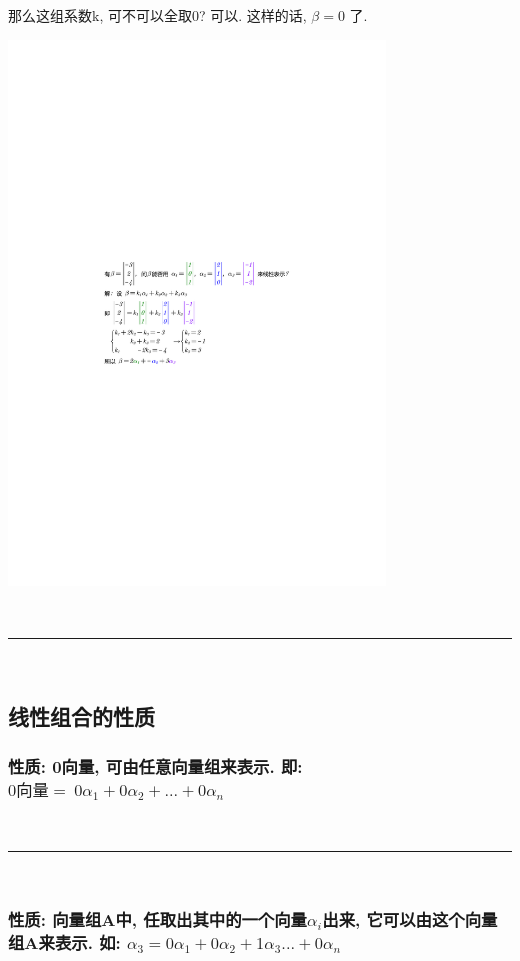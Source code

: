 \documentclass[UTF8]{ctexart}
\begin{document}
那么这组系数k, 可不可以全取0? 可以. 这样的话,  $\beta=0$ 了. \\


\begin{myEnvSample}
	\includegraphics[width=0.75\textwidth]{img/0101.pdf}
\end{myEnvSample}



~\\
\hrule
~\\

\subsection{线性组合的性质}

\subsubsection{性质: 0向量, 可由任意向量组来表示. 即: $0\text{向量}=\ 0\alpha _1+0\alpha _2+...+0\alpha _n$}

~\\
\hrule
~\\

\subsubsection{性质: 向量组A中, 任取出其中的一个向量$α_i$出来, 它可以由这个向量组A来表示. 如: $\alpha _3=0\alpha _1+0\alpha _2+1\alpha _3...+0\alpha _n$}
\end{document}
